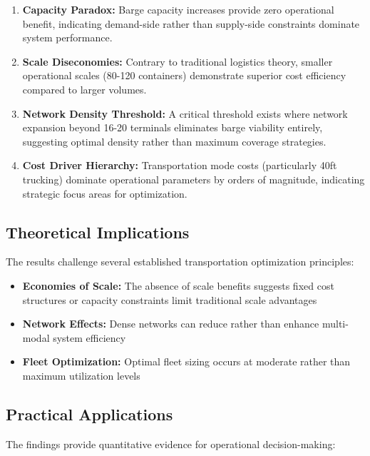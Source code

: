 \documentclass[12pt,a4paper]{article}
\begin{document}
\begin{enumerate}
    \item \textbf{Capacity Paradox:} Barge capacity increases provide zero operational benefit, indicating demand-side rather than supply-side constraints dominate system performance.
    
    \item \textbf{Scale Diseconomies:} Contrary to traditional logistics theory, smaller operational scales (80-120 containers) demonstrate superior cost efficiency compared to larger volumes.
    
    \item \textbf{Network Density Threshold:} A critical threshold exists where network expansion beyond 16-20 terminals eliminates barge viability entirely, suggesting optimal density rather than maximum coverage strategies.
    
    \item \textbf{Cost Driver Hierarchy:} Transportation mode costs (particularly 40ft trucking) dominate operational parameters by orders of magnitude, indicating strategic focus areas for optimization.
\end{enumerate}

\subsection{Theoretical Implications}

The results challenge several established transportation optimization principles:

\begin{itemize}
    \item \textbf{Economies of Scale:} The absence of scale benefits suggests fixed cost structures or capacity constraints limit traditional scale advantages
    \item \textbf{Network Effects:} Dense networks can reduce rather than enhance multi-modal system efficiency
    \item \textbf{Fleet Optimization:} Optimal fleet sizing occurs at moderate rather than maximum utilization levels
\end{itemize}

\subsection{Practical Applications}

The findings provide quantitative evidence for operational decision-making:
\end{document}
